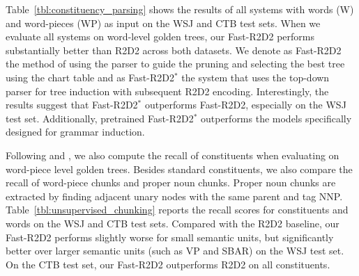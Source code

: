 Table~\ref{tbl:constituency_parsing} shows the results of all systems with words (W) and word-pieces (WP) as input on the WSJ and CTB test sets. 
When we evaluate all systems on word-level golden trees, 
our Fast-R2D2 performs substantially better than R2D2 across both datasets.
We denote as Fast-R2D2 the method of using the parser to guide the pruning and selecting the best tree using the chart table and as Fast-R2D2$^*$ the system that uses the top-down parser for tree induction with subsequent R2D2 encoding.
Interestingly, the results suggest that Fast-R2D2$^*$ outperforms Fast-R2D2, especially on the WSJ test set.
Additionally, pretrained Fast-R2D2$^*$
outperforms the models specifically designed for grammar induction.

\begin{table}[!htb]
\small
\begin{center}
\setlength{\tabcolsep}{3.5pt}
\end{center}
\caption{Recall of constituents and words. WD means word.  Values with $^{\dag}$ are taken from .}
\label{tbl:unsupervised_chunking}
\end{table}

Following  and ,
we also compute the recall of constituents when evaluating on word-piece level golden trees.
Besides standard constituents, we also compare the recall of word-piece chunks and proper noun chunks. 
Proper noun chunks are extracted by finding adjacent unary nodes with the same parent and tag NNP. 
Table~\ref{tbl:unsupervised_chunking} reports the recall scores for constituents and words on the WSJ and CTB test sets. 
Compared with the R2D2 baseline, 
our Fast-R2D2 performs slightly worse for small semantic units, 
but significantly better over larger semantic units (such as VP and SBAR) on the WSJ test set.
On the CTB test set, our Fast-R2D2 outperforms R2D2 on all constituents. 

